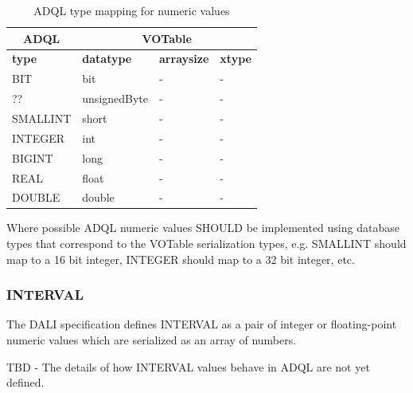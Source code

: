 \documentclass[11pt,a4paper]{ivoa}
\newcommand{\DALIspec} {DALI specification\xspace}
\begin{document}
\begin{table}[thm]\footnotesize
    \begin{tabular}
        {|p{}|p{}|p{}|p{}|}
        \hline

        \hline
        \multicolumn{1}{|c|}{\textbf{ADQL}} &
        \multicolumn{3}{|c|}{\textbf{VOTable}}
        \tabularnewline
        
        \hline
        \textbf{type} &
        \textbf{datatype} &
        \textbf{arraysize} &
        \textbf{xtype}
        \tabularnewline

        \hline
        BIT &
        bit &
        - &
        -
        \tabularnewline

        \hline
        ?? &
        unsignedByte &
        - &
        -
        \tabularnewline

        \hline
        SMALLINT &
        short &
        - &
        -
        \tabularnewline

        \hline
        INTEGER &
        int &
        - &
        -
        \tabularnewline

        \hline
        BIGINT &
        long &
        - &
        -
        \tabularnewline

        \hline
        REAL &
        float &
        - &
        -
        \tabularnewline

        \hline
        DOUBLE &
        double &
        - &
        -
        \tabularnewline

        \hline
    \end{tabular}
    \caption{ADQL type mapping for numeric values}
    \label{table:types.numeric.primitive}
\end{table}

Where possible ADQL numeric values SHOULD be implemented using database types
that correspond to the VOTable serialization types, e.g. SMALLINT should map to a
16 bit integer, INTEGER should map to a 32 bit integer, etc. 

\subsubsection{INTERVAL}
\label{sec:types.numeric.interval}

The \DALIspec defines INTERVAL as a pair of integer or floating-point
numeric values which are serialized as an array of numbers.

TBD - The details of how INTERVAL values behave in ADQL are not yet defined.
\end{document}
